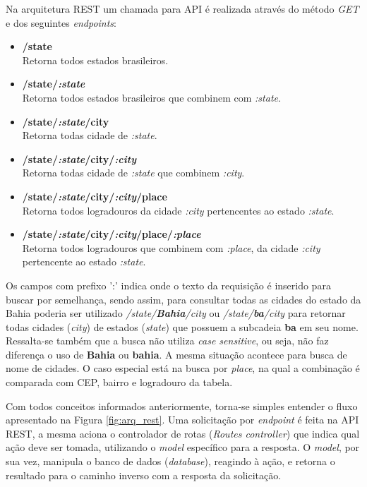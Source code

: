 \documentclass[conference]{IEEEtran}
\begin{document}
Na arquitetura REST um chamada para API é realizada através do método \textit{GET} e dos seguintes \textit{endpoints}:

\begin{itemize}
    \item \textbf{/state} \\
    Retorna todos estados brasileiros.
    \item \textbf{/state/\textit{:state}} \\
    Retorna todos estados brasileiros que combinem com \textit{:state}.
    \item \textbf{/state/\textit{:state}/city} \\
    Retorna todas cidade de \textit{:state}.
    \item \textbf{/state/\textit{:state}/city/\textit{:city}} \\
    Retorna todas cidade de \textit{:state} que combinem \textit{:city}.
    \item \textbf{/state/\textit{:state}/city/\textit{:city}/place} \\
    Retorna todos logradouros da cidade \textit{:city} pertencentes ao estado \textit{:state}.
    \item \textbf{/state/\textit{:state}/city/\textit{:city}/place/\textit{:place}} \\
    Retorna todos logradouros que combinem com \textit{:place}, da cidade \textit{:city} pertencente ao estado \textit{:state}.
\end{itemize}

Os campos com prefixo ':' indica onde o texto da requisição é inserido para buscar por semelhança, sendo assim, para consultar todas as cidades do estado da Bahia poderia ser utilizado \textit{/state/\textbf{Bahia}/city} ou \textit{/state/\textbf{ba}/city} para retornar todas cidades (\textit{city}) de estados (\textit{state}) que possuem a subcadeia \textbf{ba} em seu nome. Ressalta-se também que a busca não utiliza \textit{case sensitive}, ou seja, não faz diferença o uso de \textbf{Bahia} ou \textbf{bahia}. A mesma situação acontece para busca de nome de cidades. O caso especial está na busca por \textit{place}, na qual a combinação é comparada com CEP, bairro e logradouro da tabela.

Com todos conceitos informados anteriormente, torna-se simples entender o fluxo apresentado na Figura \ref{fig:arq_rest}. Uma solicitação por \textit{endpoint} é feita na API REST, a mesma aciona o controlador de rotas (\textit{Routes controller}) que indica qual ação deve ser tomada, utilizando o \textit{model} específico para a resposta. O \textit{model}, por sua vez, manipula o banco de dados (\textit{database}), reagindo à ação, e retorna o resultado para o caminho inverso com a resposta da solicitação.
\end{document}
